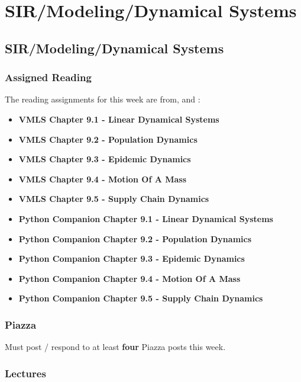 \clearpage

\renewcommand{\ChapTitle}{SIR/Modeling/Dynamical Systems}
\renewcommand{\SectionTitle}{SIR/Modeling/Dynamical Systems}

\chapter{\ChapTitle}
\section{\SectionTitle}

\subsection{Assigned Reading}

The reading assignments for this week are from, \VMLS \hspace*{1pt} and \PyCap:

\begin{itemize}
    \item \textbf{VMLS Chapter 9.1 - Linear Dynamical Systems}
    \item \textbf{VMLS Chapter 9.2 - Population Dynamics}
    \item \textbf{VMLS Chapter 9.3 - Epidemic Dynamics}
    \item \textbf{VMLS Chapter 9.4 - Motion Of A Mass}
    \item \textbf{VMLS Chapter 9.5 - Supply Chain Dynamics}
    \item \textbf{Python Companion Chapter 9.1 - Linear Dynamical Systems}
    \item \textbf{Python Companion Chapter 9.2 - Population Dynamics}
    \item \textbf{Python Companion Chapter 9.3 - Epidemic Dynamics}
    \item \textbf{Python Companion Chapter 9.4 - Motion Of A Mass}
    \item \textbf{Python Companion Chapter 9.5 - Supply Chain Dynamics}
\end{itemize}

\subsection{Piazza}

Must post / respond to at least \textbf{four} Piazza posts this week.

\subsection{Lectures}

